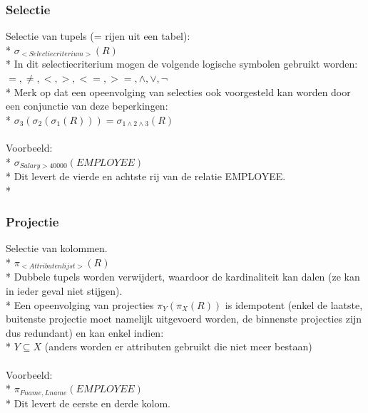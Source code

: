 \documentclass[10pt]{article}
\begin{document}
\subsubsection{Selectie}
Selectie van tupels (= rijen uit een tabel):\\*
$\sigma_{<Selectiecriterium>}(R)$\\*
In dit selectiecriterium mogen de volgende logische symbolen gebruikt worden: 
$=, \ne, <, >, <=, >=, \wedge, \vee, \neg$\\*
Merk op dat een opeenvolging van selecties ook voorgesteld kan worden door een conjunctie van deze beperkingen:\\*
$\sigma_3(\sigma_2(\sigma_1(R))) = \sigma_{1 \wedge 2 \wedge 3}(R)$\\\\
Voorbeeld:\\*
$\sigma_{Salary > 40000}(EMPLOYEE)$\\*
Dit levert de vierde en achtste rij van de relatie EMPLOYEE.\\*
\subsubsection{Projectie}
Selectie van kolommen.\\*
$\pi_{<Attributenlijst>}(R)$\\*
Dubbele tupels worden verwijdert, waardoor de kardinaliteit kan dalen (ze kan in ieder geval niet stijgen).\\*
Een opeenvolging van projecties $\pi_Y(\pi_X(R))$ is idempotent (enkel de laatste, buitenste projectie moet namelijk uitgevoerd worden, de binnenste projecties zijn dus redundant) en kan enkel indien:\\*
$Y \subseteq X$ (anders worden er attributen gebruikt die niet meer bestaan)\\\\
Voorbeeld:\\*
$\pi_{Fname, Lname}(EMPLOYEE)$\\*
Dit levert de eerste en derde kolom.
\end{document}
